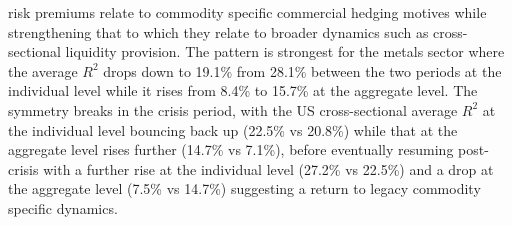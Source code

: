 \documentclass[
  authoryear,
  preprint,
  3p]{elsarticle}
\begin{document}
risk premiums relate to commodity specific commercial hedging motives
while strengthening that to which they relate to broader dynamics such
as cross-sectional liquidity provision. The pattern is strongest for the
metals sector where the average \(R^{2}\) drops down to 19.1\% from
28.1\% between the two periods at the individual level while it rises
from 8.4\% to 15.7\% at the aggregate level. The symmetry breaks in the
crisis period, with the US cross-sectional average \(R^{2}\) at the
individual level bouncing back up (22.5\% vs 20.8\%) while that at the
aggregate level rises further (14.7\% vs 7.1\%), before eventually
resuming post-crisis with a further rise at the individual level (27.2\%
vs 22.5\%) and a drop at the aggregate level (7.5\% vs 14.7\%)
suggesting a return to legacy commodity specific dynamics.

\medskip
\end{document}
